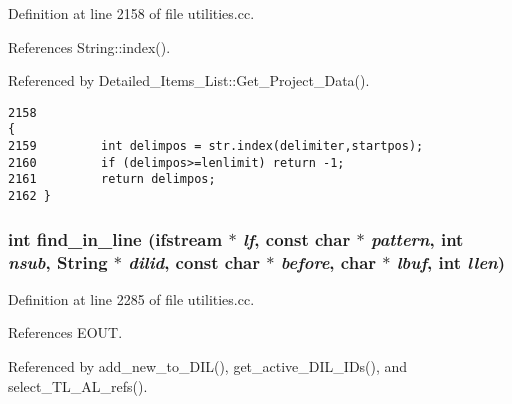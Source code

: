 Definition at line 2158 of file utilities.cc.

References String::index().

Referenced by Detailed\_\-Items\_\-List::Get\_\-Project\_\-Data().



\footnotesize\begin{verbatim}2158                                                                                            {
2159         int delimpos = str.index(delimiter,startpos);
2160         if (delimpos>=lenlimit) return -1;
2161         return delimpos;
2162 }
\end{verbatim}\normalsize 
{}
\subsubsection{\setlength{\rightskip}{0pt plus 5cm}int find\_\-in\_\-line (ifstream $\ast$ {\em lf}, const char $\ast$ {\em pattern}, int {\em nsub}, {\bf String} $\ast$ {\em dilid}, const char $\ast$ {\em before}, char $\ast$ {\em lbuf}, int {\em llen})}\label{utilities_8cc_a48}




Definition at line 2285 of file utilities.cc.

References EOUT.

Referenced by add\_\-new\_\-to\_\-DIL(), get\_\-active\_\-DIL\_\-IDs(), and select\_\-TL\_\-AL\_\-refs().



